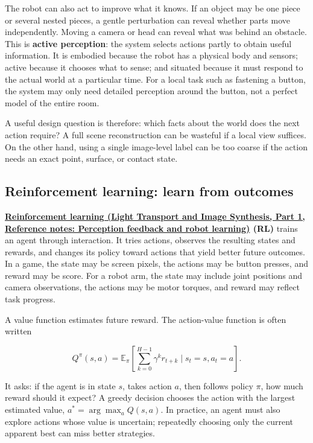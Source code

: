 The robot can also act to improve what it knows. If an object may be one piece or several nested pieces, a gentle perturbation can reveal whether parts move independently. Moving a camera or head can reveal what was behind an obstacle. This is \textbf{active perception}: the system selects actions partly to obtain useful information. It is embodied because the robot has a physical body and sensors; active because it chooses what to sense; and situated because it must respond to the actual world at a particular time. For a local task such as fastening a button, the system may only need detailed perception around the button, not a perfect model of the entire room.

A useful design question is therefore: which facts about the world does the next action require? A full scene reconstruction can be wasteful if a local view suffices. On the other hand, using a single image-level label can be too coarse if the action needs an exact point, surface, or contact state.

\subsection{Reinforcement learning: learn from outcomes}\label{04-visual-computing-ii-ch034-reinforcement-learning-learn-from-outcomes}

\hypertarget{04-visual-computing-ii-ch034-reinforcement-learning-learn-from-outcomes}{}

\textbf{\href{../04-Light-Transport-and-Image-Synthesis-P01/main.pdf\#nameddest=appendix-b0c42da325f1}{Reinforcement learning (Light Transport and Image Synthesis, Part 1, Reference notes: Perception feedback and robot learning)} (RL)} trains an agent through interaction. It tries actions, observes the resulting states and rewards, and changes its policy toward actions that yield better future outcomes. In a game, the state may be screen pixels, the actions may be button presses, and reward may be score. For a robot arm, the state may include joint positions and camera observations, the actions may be motor torques, and reward may reflect task progress.

A value function estimates future reward. The action-value function is often written

\[
Q^\pi(s,a)=\mathbb{E}_{\pi}\left[\sum_{k=0}^{H-1}\gamma^k r_{t+k}\mid s_t=s,a_t=a\right].
\]

It asks: if the agent is in state \(s\), takes action \(a\), then follows policy \(\pi\), how much reward should it expect? A greedy decision chooses the action with the largest estimated value, \(a^*=\arg\max_a Q(s,a)\). In practice, an agent must also explore actions whose value is uncertain; repeatedly choosing only the current apparent best can miss better strategies.

